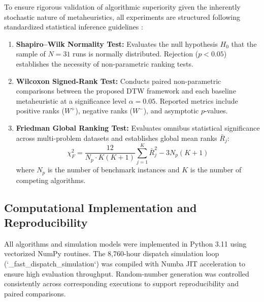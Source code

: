 To ensure rigorous validation of algorithmic superiority given the inherently stochastic nature of metaheuristics, all experiments are structured following standardized statistical inference guidelines \cite{derrac2011practical,garcia2010study}:
\begin{enumerate}
    \item \textbf{Shapiro--Wilk Normality Test:} Evaluates the null hypothesis $H_0$ that the sample of $N=31$ runs is normally distributed. Rejection ($p < 0.05$) establishes the necessity of non-parametric ranking tests.
    \item \textbf{Wilcoxon Signed-Rank Test:} Conducts paired non-parametric comparisons between the proposed DTW framework and each baseline metaheuristic at a significance level $\alpha = 0.05$. Reported metrics include positive ranks ($W^+$), negative ranks ($W^-$), and asymptotic $p$-values.
    \item \textbf{Friedman Global Ranking Test:} Evaluates omnibus statistical significance across multi-problem datasets and establishes global mean ranks $\bar{R}_j$:
    \begin{equation}
    \chi_F^2 = \frac{12}{N_p \cdot K(K+1)} \sum_{j=1}^{K} \bar{R}_j^2 - 3 N_p(K+1)
    \label{eq:friedman_stat}
    \end{equation}
    where $N_p$ is the number of benchmark instances and $K$ is the number of competing algorithms.
\end{enumerate}

\subsection{Computational Implementation and Reproducibility}
\label{sec:computational_implementation}

All algorithms and simulation models were implemented in Python 3.11 using vectorized NumPy routines. The 8,760-hour dispatch simulation loop (`_fast_dispatch_simulation`) was compiled with Numba JIT acceleration to ensure high evaluation throughput. Random-number generation was controlled consistently across corresponding executions to support reproducibility and paired comparisons.
